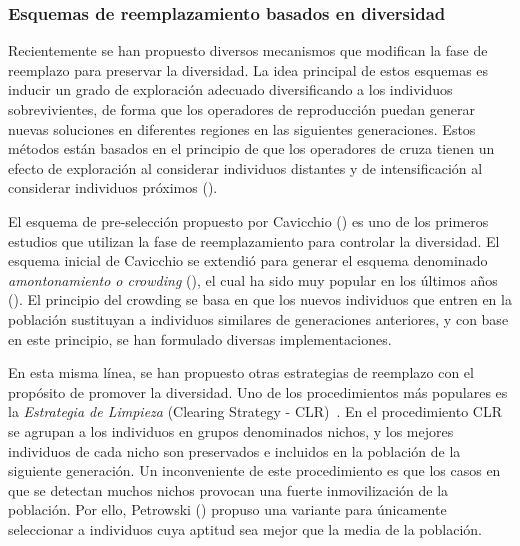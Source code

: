 \subsubsection{Esquemas de reemplazamiento basados en diversidad}

Recientemente se han propuesto diversos mecanismos que modifican la fase de reemplazo para preservar la diversidad.
%
La idea principal de estos esquemas es inducir un grado de exploración adecuado diversificando a los individuos sobrevivientes,
de forma que los operadores de reproducción puedan generar nuevas soluciones en diferentes regiones en las siguientes generaciones.
%
Estos métodos están basados en el principio de que los operadores de cruza tienen un efecto de exploración al 
considerar individuos distantes y de intensificación al considerar individuos próximos (\cite{eiben1998evolutionary}).

El esquema de pre-selección propuesto por Cavicchio (\cite{grefenstette1986optimization}) es uno de los primeros estudios que utilizan la fase de reemplazamiento para controlar la diversidad.
%
El esquema inicial de Cavicchio se extendió para generar el esquema denominado \textit{amontonamiento o crowding} (\cite{de1975analysis}), el cual ha sido muy popular 
en los últimos años (\cite{mahfoud1992crowding, mengshoel2014adaptive}).
%
El principio del crowding se basa en que los nuevos individuos que entren en la población sustituyan a individuos similares de generaciones anteriores, y con base en este principio, se han formulado diversas implementaciones.

En esta misma línea, se han propuesto otras estrategias de reemplazo con el propósito de promover la diversidad.
%
Uno de los procedimientos más populares es la \textit{Estrategia de Limpieza} (Clearing Strategy - CLR)~\cite{lozano2008replacement}.
%
En el procedimiento CLR se agrupan a los individuos en grupos denominados nichos, y los mejores individuos de cada nicho son preservados e incluidos en la población de la siguiente generación.
%
Un inconveniente de este procedimiento es que los casos en que se detectan muchos nichos provocan una fuerte inmovilización de la población.
%
Por ello, Petrowski (\cite{petrowski1996clearing}) propuso una variante para únicamente seleccionar a individuos cuya aptitud sea mejor que la media de la población.


